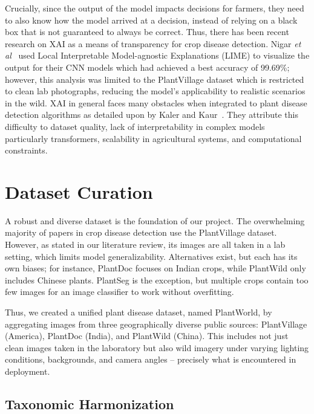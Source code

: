 \documentclass{bmvc2k}
\def\etal{\emph{et al}\bmvaOneDot}
\begin{document}
Crucially, since the output of the model impacts decisions for farmers, they need to also know how the model arrived at a decision, instead of relying on a black box that is not guaranteed to always be correct. Thus, there has been recent research on XAI as a means of transparency for crop disease detection. Nigar \etal~\cite{nigar2024} used Local Interpretable Model-agnostic Explanations (LIME) to visualize the output for their CNN models which had achieved a best accuracy of 99.69\%; however, this analysis was limited to the PlantVillage dataset which is restricted to clean lab photographs, reducing the model's applicability to realistic scenarios in the wild. XAI in general faces many obstacles when integrated to plant disease detection algorithms as detailed upon by Kaler and Kaur~\cite{kaler2025}. They attribute this difficulty to dataset quality, lack of interpretability in complex models particularly transformers, scalability in agricultural systems, and computational constraints.

\section{Dataset Curation}
\label{sec:dataset}

A robust and diverse dataset is the foundation of our project. The overwhelming majority of papers in crop disease detection use the PlantVillage dataset. However, as stated in our literature review, its images are all taken in a lab setting, which limits model generalizability. Alternatives exist, but each has its own biases; for instance, PlantDoc focuses on Indian crops, while PlantWild only includes Chinese plants. PlantSeg is the exception, but multiple crops contain too few images for an image classifier to work without overfitting.

Thus, we created a unified plant disease dataset, named PlantWorld, by aggregating images from three geographically diverse public sources: PlantVillage (America), PlantDoc (India), and PlantWild (China). This includes not just clean images taken in the laboratory but also wild imagery under varying lighting conditions, backgrounds, and camera angles -- precisely what is encountered in deployment.

\subsection{Taxonomic Harmonization}
\end{document}
